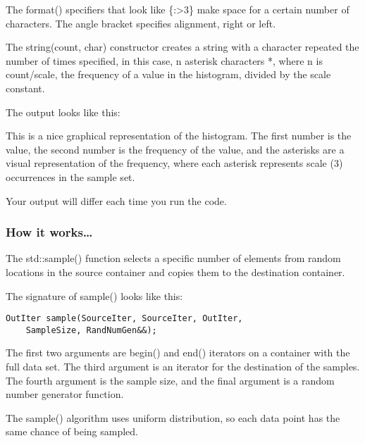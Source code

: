 \begin{itemize}
The format() specifiers that look like \{:>3\} make space for a certain number of characters. The angle bracket specifies alignment, right or left.

The string(count, char) constructor creates a string with a character repeated the number of times specified, in this case, n asterisk characters *, where n is count/scale, the frequency of a value in the histogram, divided by the scale constant.

The output looks like this:


This is a nice graphical representation of the histogram. The first number is the value, the second number is the frequency of the value, and the asterisks are a visual representation of the frequency, where each asterisk represents scale (3) occurrences in the sample set.

Your output will differ each time you run the code.
\end{itemize}

\subsubsection{How it works…}

The std::sample() function selects a specific number of elements from random locations in the source container and copies them to the destination container.

The signature of sample() looks like this:

\begin{lstlisting}[style=styleCXX]
OutIter sample(SourceIter, SourceIter, OutIter,
	SampleSize, RandNumGen&&);
\end{lstlisting}

The first two arguments are begin() and end() iterators on a container with the full data set. The third argument is an iterator for the destination of the samples. The fourth argument is the sample size, and the final argument is a random number generator function.

The sample() algorithm uses uniform distribution, so each data point has the same chance of being sampled.
























